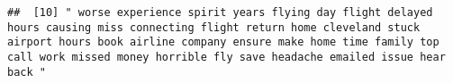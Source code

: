 \documentclass[
]{article}
\begin{document}
\begin{verbatim}
##  [10] " worse experience spirit years flying day flight delayed hours causing miss connecting flight return home cleveland stuck airport hours book airline company ensure make home time family top call work missed money horrible fly save headache emailed issue hear back "                                                                                                                                                                                                                                                                                                                                                                                                                                                                                                                                                                                                                                                                                                                                                                                                                                                                                                                                                                                                                                                                                                                                                                                                                                                                                                                                                                                                                                                                                                                      

\end{verbatim}
\end{document}

